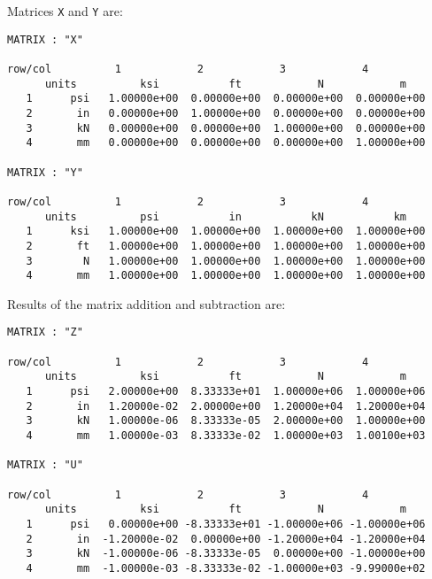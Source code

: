 \vspace{0.15 in}\noindent
Matrices {\tt X} and {\tt Y} are:

\begin{footnotesize}
\begin{verbatim}
MATRIX : "X"

row/col          1            2            3            4          
      units          ksi           ft            N            m   
   1      psi   1.00000e+00  0.00000e+00  0.00000e+00  0.00000e+00
   2       in   0.00000e+00  1.00000e+00  0.00000e+00  0.00000e+00
   3       kN   0.00000e+00  0.00000e+00  1.00000e+00  0.00000e+00
   4       mm   0.00000e+00  0.00000e+00  0.00000e+00  1.00000e+00

MATRIX : "Y"

row/col          1            2            3            4          
      units          psi           in           kN           km   
   1      ksi   1.00000e+00  1.00000e+00  1.00000e+00  1.00000e+00
   2       ft   1.00000e+00  1.00000e+00  1.00000e+00  1.00000e+00
   3        N   1.00000e+00  1.00000e+00  1.00000e+00  1.00000e+00
   4       mm   1.00000e+00  1.00000e+00  1.00000e+00  1.00000e+00
\end{verbatim}
\end{footnotesize}

\vspace{0.15 in}\noindent
Results of the matrix addition and subtraction are:

\begin{footnotesize}
\begin{verbatim}
MATRIX : "Z"

row/col          1            2            3            4          
      units          ksi           ft            N            m   
   1      psi   2.00000e+00  8.33333e+01  1.00000e+06  1.00000e+06
   2       in   1.20000e-02  2.00000e+00  1.20000e+04  1.20000e+04
   3       kN   1.00000e-06  8.33333e-05  2.00000e+00  1.00000e+00
   4       mm   1.00000e-03  8.33333e-02  1.00000e+03  1.00100e+03

MATRIX : "U"

row/col          1            2            3            4          
      units          ksi           ft            N            m   
   1      psi   0.00000e+00 -8.33333e+01 -1.00000e+06 -1.00000e+06
   2       in  -1.20000e-02  0.00000e+00 -1.20000e+04 -1.20000e+04
   3       kN  -1.00000e-06 -8.33333e-05  0.00000e+00 -1.00000e+00
   4       mm  -1.00000e-03 -8.33333e-02 -1.00000e+03 -9.99000e+02
\end{verbatim}
\end{footnotesize}


